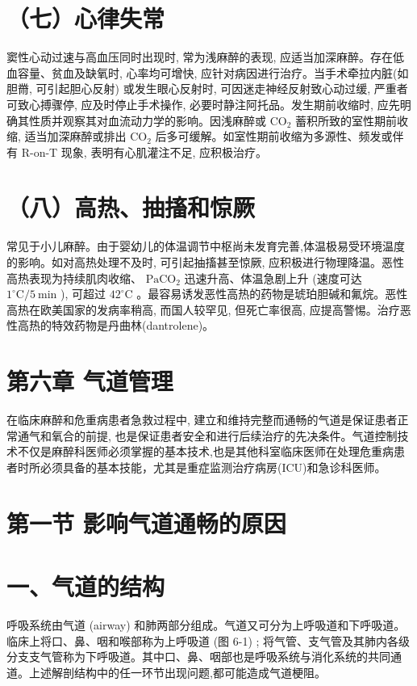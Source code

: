 \documentclass[10pt]{article}
\begin{document}
\section*{（七）心律失常}
窦性心动过速与高血压同时出现时, 常为浅麻醉的表现, 应适当加深麻醉。存在低血容量、贫血及缺氧时, 心率均可增快, 应针对病因进行治疗。当手术牵拉内脏(如胆黹, 可引起胆心反射) 或发生眼心反射时, 可因迷走神经反射致心动过缓, 严重者可致心搏骤停, 应及时停止手术操作, 必要时静注阿托品。发生期前收缩时, 应先明确其性质并观察其对血流动力学的影响。因浅麻醉或 $\mathrm{CO}_{2}$ 蓄积所致的室性期前收缩, 适当加深麻醉或排出 $\mathrm{CO}_{2}$ 后多可缓解。如室性期前收缩为多源性、频发或伴有 R-on-T 现象, 表明有心肌灌注不足, 应积极治疗。

\section*{（八）高热、抽搐和惊厥}
常见于小儿麻醉。由于婴幼儿的体温调节中枢尚未发育完善,体温极易受环境温度的影响。如对高热处理不及时, 可引起抽搐甚至惊厥, 应积极进行物理降温。恶性高热表现为持续肌肉收缩、 $\mathrm{PaCO}_{2}$ 迅速升高、体温急剧上升 (速度可达 $1^{\circ} \mathrm{C} / 5 \mathrm{~min}$ ), 可超过 $42^{\circ} \mathrm{C}$ 。最容易诱发恶性高热的药物是琥珀胆碱和氟烷。恶性高热在欧美国家的发病率稍高, 而国人较罕见, 但死亡率很高, 应提高警惕。治疗恶性高热的特效药物是丹曲林(dantrolene)。

\section*{第六章 气道管理}
在临床麻醉和危重病患者急救过程中, 建立和维持完整而通畅的气道是保证患者正常通气和氧合的前提, 也是保证患者安全和进行后续治疗的先决条件。气道控制技术不仅是麻醉科医师必须掌握的基本技术,也是其他科室临床医师在处理危重病患者时所必须具备的基本技能，尤其是重症监测治疗病房(ICU)和急诊科医师。

\section*{第一节 影响气道通畅的原因}
\section*{一、气道的结构}
呼吸系统由气道 (airway) 和肺两部分组成。气道又可分为上呼吸道和下呼吸道。临床上将口、鼻、咽和喉部称为上呼吸道 (图 6-1) ; 将气管、支气管及其肺内各级分支支气管称为下呼吸道。其中口、鼻、咽部也是呼吸系统与消化系统的共同通道。上述解剖结构中的任一环节出现问题,都可能造成气道梗阻。
\end{document}
